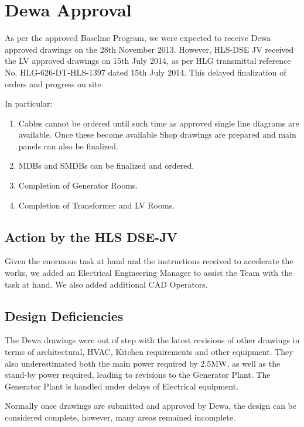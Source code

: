 \chapter{Dewa Approval}
\label{ch:dewa}

As per the approved Baseline Program, we were expected to receive Dewa approved drawings on the 28th November 2013. However, HLS-DSE JV received the LV approved drawings on 15th July 2014, as per HLG transmittal reference No. HLG-626-DT-HLS-1397 dated 15th July 2014. This delayed finalization of orders and progress on site.

 In particular:
 
 \begin{enumerate}
 \item Cables cannot be ordered until such time as approved single line diagrams are available. Once these become available  Shop drawings are prepared and main panels can also be finalized.
 \item MDBs and SMDBs can be finalized and ordered.
 \item Completion of Generator Rooms.
 \item Completion of Transformer and LV Rooms.
  \end{enumerate} 
  
\section{Action by the HLS DSE-JV}
  
Given the enormous task at hand and the instructions received to accelerate the works, we added an Electrical Engineering Manager to assist the Team with the task at hand. We also added additional CAD Operators.

\section{Design Deficiencies}

The Dewa drawings were out of step with the latest revisions of other drawings in terms of architectural, HVAC, Kitchen requirements and other equipment. They also underestimated both the main power required by 2.5MW, as well as the stand-by power required, leading to revisions to the Generator Plant. The Generator Plant is handled under delays of Electrical equipment.

Normally once drawings are submitted and approved by Dewa, the design can be considered complete, however, many areas remained incomplete.

